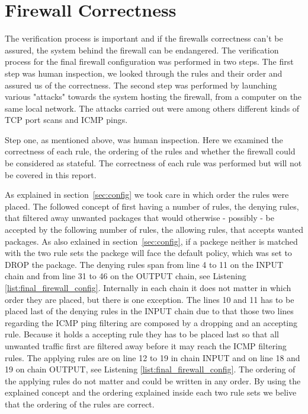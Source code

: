 \section{Firewall Correctness}
\label{sec:correctness}

The verification process is important and if the firewalls correctness can't be assured, the system behind the firewall can be endangered. The verification process for the final firewall configuration was performed in two steps. The first step was human inspection, we looked through the rules and their order and assured us of the correctness. The second step was performed by launching various "attacks" towards the system hosting the firewall, from a computer on the same local network. The attacks carried out were among others different kinds of TCP port scans and ICMP pings.

Step one, as mentioned above, was human inspection. Here we examined the correctness of each rule, the ordering of the rules and whether the firewall could be considered as stateful. The correctness of each rule was performed but will not be covered in this report.  

As explained in section~\ref{sec:config} we took care in which order the rules were placed. The followed concept of first having a number of rules, the denying rules, that filtered away unwanted packages that would otherwise - possibly - be accepted by the following number of rules, the allowing rules, that accepts wanted packages. As also exlained in section~\ref{sec:config}, if a packege neither is matched with the two rule sets the packege will face the default policy, which was set to DROP the package. The denying rules span from line 4 to 11 on the INPUT chain and from line 31 to 46 on the OUTPUT chain, see Listening \ref{list:final_firewall_config}. Internally in each chain it does not matter in which order they are placed, but there is one exception. The lines 10 and 11 has to be placed last of the denying rules in the INPUT chain due to that those two lines regarding the ICMP ping filtering are composed by a dropping and an accepting rule. Because it holds a accepting rule they has to be placed last so that all unwanted traffic first are filtered away before it may reach the ICMP filtering rules. The applying rules are on line 12 to 19 in chain INPUT and on line 18 and 19 on chain OUTPUT, see Listening \ref{list:final_firewall_config}. The ordering of the applying rules do not matter and could be written in any order. By using the explained concept and the ordering explained inside each two rule sets we belive that the ordering of the rules are correct.

